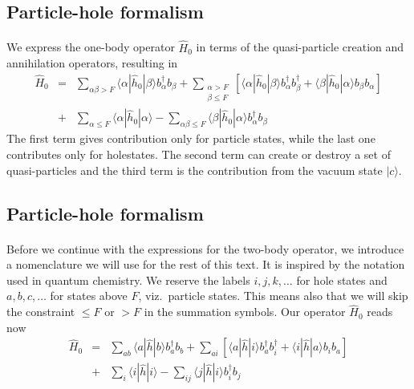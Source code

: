 \documentclass[%
twoside,                 %
final,                   %
10pt]{article}
\begin{document}
\subsection{Particle-hole formalism}

\paragraph{}
We express the one-body operator $\hat{H}_0$ in terms of the quasi-particle creation and annihilation operators, resulting in
\begin{eqnarray}
	\hat{H}_0 &=& \sum_{\alpha\beta > F} \langle \alpha|\hat{h}_0|\beta\rangle  b_\alpha^\dagger b_\beta +
		\sum_{\begin{array}{c} \alpha > F \\ \beta \leq F \end{array}} \left[
		\langle \alpha|\hat{h}_0|\beta\rangle b_\alpha^\dagger b_\beta^\dagger + 
		\langle \beta|\hat{h}_0|\alpha\rangle b_\beta  b_\alpha \right] \nonumber \\
	&+& \sum_{\alpha \leq F} \langle \alpha|\hat{h}_0|\alpha\rangle - 
		\sum_{\alpha\beta \leq F} \langle \beta|\hat{h}_0|\alpha\rangle
		b_\alpha^\dagger b_\beta \label{eq:2-63b}
\end{eqnarray}
The first term  gives contribution only for particle states, while the last one
contributes only for holestates. The second term can create or destroy a set of
quasi-particles and 
the third term is the contribution  from the vacuum state $|c\rangle$.





\subsection{Particle-hole formalism}

\paragraph{}
Before we continue with the expressions for the two-body operator, we introduce a nomenclature we will use for the rest of this
text. It is inspired by the notation used in quantum chemistry.
We reserve the labels $i,j,k,\dots$ for hole states and $a,b,c,\dots$ for states above $F$, viz.~particle states.
This means also that we will skip the constraint $\leq F$ or $> F$ in the summation symbols. 
Our operator $\hat{H}_0$  reads now 
\begin{eqnarray}
	\hat{H}_0 &=& \sum_{ab} \langle a|\hat{h}|b\rangle b_a^\dagger b_b +
		\sum_{ai} \left[
		\langle a|\hat{h}|i\rangle b_a^\dagger b_i^\dagger + 
		\langle i|\hat{h}|a\rangle b_i  b_a \right] \nonumber \\
	&+& \sum_{i} \langle i|\hat{h}|i\rangle - 
		\sum_{ij} \langle j|\hat{h}|i\rangle
		b_i^\dagger b_j \label{eq:2-63b}
\end{eqnarray}
\end{document}
